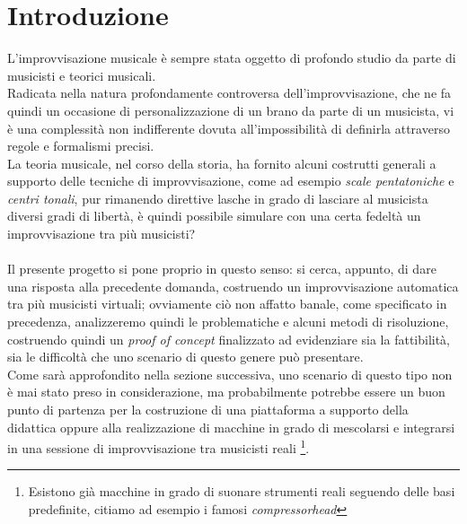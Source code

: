 \section{Introduzione}
L'improvvisazione musicale è sempre stata oggetto di profondo studio da parte
di musicisti e teorici musicali.\\
Radicata nella natura profondamente controversa dell'improvvisazione,
che ne fa quindi un occasione di personalizzazione di un brano da parte di un musicista,
vi è una complessità non indifferente dovuta all'impossibilità di definirla
attraverso regole e formalismi precisi.\\
La teoria musicale, nel corso della storia, ha fornito alcuni costrutti generali
a supporto delle tecniche di improvvisazione, come ad esempio
\emph{scale pentatoniche} e \emph{centri tonali}, pur rimanendo direttive lasche
in grado di lasciare al musicista diversi gradi di libertà, è quindi possibile
simulare con una certa fedeltà un improvvisazione tra più musicisti?\\
\\
Il presente progetto si pone proprio in questo senso:
si cerca, appunto, di dare una risposta alla precedente domanda, costruendo un
improvvisazione automatica tra più musicisti virtuali; ovviamente ciò non affatto
banale, come specificato in precedenza, analizzeremo quindi le problematiche
e alcuni metodi di risoluzione, costruendo quindi un \emph{proof of concept} finalizzato
ad evidenziare sia la fattibilità, sia le difficoltà che uno scenario di questo
genere può presentare.\\
Come sarà approfondito nella sezione successiva, uno scenario di questo tipo
non è mai stato preso in considerazione, ma probabilmente potrebbe essere
un buon punto di partenza per la costruzione di una piattaforma a supporto della
didattica oppure alla realizzazione di macchine in grado di mescolarsi e integrarsi
in una sessione di improvvisazione tra musicisti reali
\footnote{Esistono già macchine in grado di suonare strumenti reali seguendo
delle basi predefinite, citiamo ad esempio i famosi \emph{compressorhead}}.
